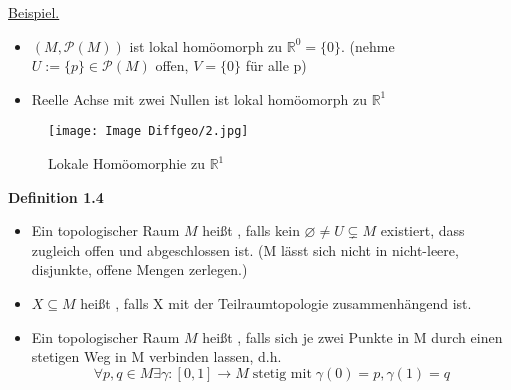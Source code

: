 \documentclass[fleqn, 12pt, letterpaper]{article}
\newcommand{\txt}[1]{\text{#1}}
\begin{document}
\underline{Beispiel.}
\begin{itemize}
	\item $(M, \mathcal{P}(M))$ ist lokal homöomorph zu $\mathbb{R}^0=\{0\}$. (nehme $U:=\{p\}\in \mathcal{P}(M)$ offen, $V=\{0\}$ für alle p)
	\item Reelle Achse mit zwei Nullen ist lokal homöomorph zu $\mathbb{R}^1$
\end{itemize}

\begin{figure}[H]
    \centering
    \texttt{[image: Image Diffgeo/2.jpg]}
	\caption{Lokale Homöomorphie zu $\mathbb{R}^1$}
 \end{figure}

\textbf{Definition 1.4}\begin{itemize}
	\item Ein topologischer Raum $M$ heißt , falls kein $\varnothing \neq U \subsetneq M$ existiert, dass zugleich offen und abgeschlossen ist. (M lässt sich nicht in nicht-leere, disjunkte, offene Mengen zerlegen.)
	\item $X\subseteq M$ heißt , falls X mit der Teilraumtopologie zusammenhängend ist.
	\item Ein topologischer Raum $M$ heißt , falls sich je zwei Punkte in M durch einen stetigen Weg in M verbinden lassen, d.h. 
	\begin{equation*}
		\forall p, q\in M \exists  \gamma:[0,1]\rightarrow M \;\txt{stetig mit}\; \gamma(0)=p, \gamma(1)=q 
	\end{equation*}
\end{itemize}
\end{document}
